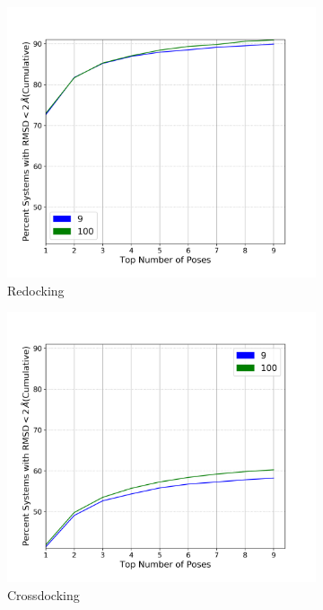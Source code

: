 \documentclass[journal=jcisd8,manuscript=article]{achemso}
\begin{document}
\begin{figure}    
        \begin{subfigure}[b]{0.48\textwidth}    
		\centering
		\includegraphics[width=\textwidth]{figures/redocking/sweep_num_modes_line.png}
		\caption{Redocking}
		\label{fig:num modes rd}
        \end{subfigure}    
        \begin{subfigure}[b]{0.48\textwidth}    
		\centering
		\includegraphics[width=\textwidth]{figures/crossdocking/sweep_num_modes_line.png}
		\caption{Crossdocking}
		\label{fig:num modes cd}
        \end{subfigure}    
	\caption{}
	\label{fig:num modes}
\end{figure}    
\end{document}
